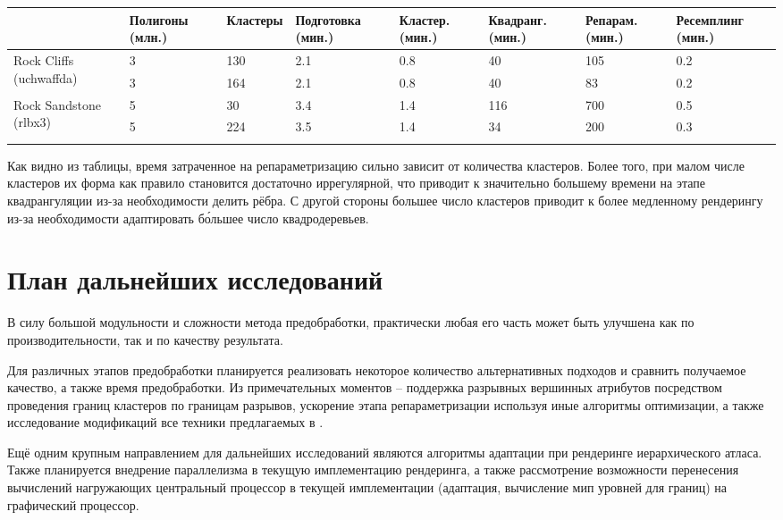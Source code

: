 \documentclass[12pt]{extarticle}
\begin{document}
\begin{center}
\small
\begin{tabular}{ l | p{16mm} | p{15mm} | p{17mm} | p{12mm} | p{14mm} | p{13mm} | p{17mm} }
                        & Полигоны (млн.) & Кластеры & Подготовка (мин.) & Кластер. (мин.) & Квадранг. (мин.) & Репарам. (мин.) & Ресемплинг (мин.) \\
\hline
\multirow{2}{18mm}{Rock Cliffs (uchwaffda)}
& 3    & 130 & 2.1   & 0.8  & 40   & 105    & 0.2   \\
& 3    & 164 & 2.1   & 0.8  & 40   & 83     & 0.2   \\
\hline
\multirow{3}{16mm}{Rock Sandstone (rlbx3)}
& 5    & 30  & 3.4   & 1.4  & 116  & 700    & 0.5   \\
& 5    & 224 & 3.5   & 1.4  & 34   & 200    & 0.3   \\
&&&&&&&\\
\end{tabular}
\end{center}

Как видно из таблицы, время затраченное на репараметризацию сильно зависит от количества кластеров. Более того, при малом числе кластеров их форма как правило становится достаточно иррегулярной, что приводит к значительно большему времени на этапе квадрангуляции из-за необходимости делить рёбра. С другой стороны большее число кластеров приводит к более медленному рендерингу из-за необходимости адаптировать б\'ольшее число квадродеревьев.


\section{План дальнейших исследований}
В силу большой модульности и сложности метода предобработки, практически любая его часть может быть улучшена как по производительности, так и по качеству результата.

Для различных этапов предобработки планируется реализовать некоторое количество альтернативных подходов и сравнить получаемое качество, а также время предобработки. Из примечательных моментов -- поддержка разрывных вершинных атрибутов посредством проведения границ кластеров по границам разрывов, ускорение этапа репараметризации используя иные алгоритмы оптимизации, а также исследование модификаций все техники предлагаемых в \cite{feng2010feature}.

Ещё одним крупным направлением для дальнейших исследований являются алгоритмы адаптации при рендеринге иерархического атласа. Также планируется внедрение параллелизма в текущую имплементацию рендеринга, а также рассмотрение возможности перенесения вычислений нагружающих центральный процессор в текущей имплементации (адаптация, вычисление мип уровней для границ) на графический процессор.


\newpage

\end{document}
